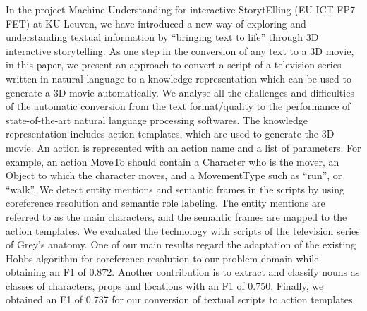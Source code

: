 \documentclass[10pt, a4paper, twopage, headinclude, footinclude, BCOR5mm]{scrartcl}
\begin{document}
{{        \begin{table}[t!]
    \end{table}
        \begin{table}[t!]
    \end{table}

\noindent
In the project Machine Understanding for interactive StorytElling (EU ICT FP7 FET) at KU Leuven, we have introduced a new way of exploring and understanding textual information by “bringing text to life” through 3D interactive storytelling. As one step in the conversion of any text to a 3D movie, in this paper, we present an approach to convert a script of a television series written in natural language to a knowledge representation which can be used to generate a 3D movie automatically.  We analyse all the challenges and difficulties of the automatic conversion from the text format/quality to the performance of state-of-the-art natural language processing softwares. The knowledge representation includes action templates, which are used to generate the 3D movie. An action is represented with an action name and a list of parameters. For example, an action MoveTo should contain a Character who is the mover, an Object to which the character moves, and a MovementType such as “run”, or “walk”. We detect entity mentions and semantic frames in the scripts by using coreference resolution and semantic role labeling. The entity mentions are referred to as the main characters, and the semantic frames are mapped to the action templates. We evaluated the technology with scripts of the television series of Grey's anatomy. One of our main results regard the adaptation of the existing Hobbs algorithm for coreference resolution to our problem domain while obtaining an F1 of 0.872. Another contribution is to extract and classify nouns as classes of characters, props and locations with an F1 of 0.750. Finally, we obtained an F1 of 0.737 for our conversion of textual scripts to action templates. 


}}
\end{document}
